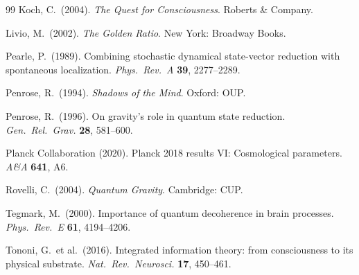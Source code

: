 \documentclass[12pt,a4paper]{article}
\numberwithin{equation}{section}
\begin{document}
\begin{thebibliography}{99}
Koch, C.\ (2004). \textit{The Quest for Consciousness}. Roberts \& Company.

Livio, M.\ (2002). \textit{The Golden Ratio}. New York: Broadway Books.

Pearle, P.\ (1989). Combining stochastic dynamical state-vector reduction with spontaneous localization.
\textit{Phys.\ Rev.\ A} \textbf{39}, 2277--2289.

Penrose, R.\ (1994). \textit{Shadows of the Mind}. Oxford: OUP.

Penrose, R.\ (1996). On gravity's role in quantum state reduction.
\textit{Gen.\ Rel.\ Grav.} \textbf{28}, 581--600.

Planck Collaboration (2020). Planck 2018 results VI: Cosmological parameters.
\textit{A\&A} \textbf{641}, A6.

Rovelli, C.\ (2004). \textit{Quantum Gravity}. Cambridge: CUP.

Tegmark, M.\ (2000). Importance of quantum decoherence in brain processes.
\textit{Phys.\ Rev.\ E} \textbf{61}, 4194--4206.

Tononi, G.\ et al.\ (2016). Integrated information theory: from consciousness to its physical substrate.
\textit{Nat.\ Rev.\ Neurosci.} \textbf{17}, 450--461.

\end{thebibliography}
\end{document}
